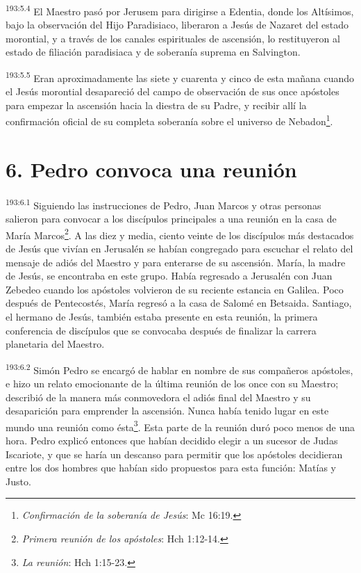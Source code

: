 \par
\textsuperscript{193:5.4} El Maestro pasó por Jerusem para dirigirse a Edentia, donde los Altísimos, bajo la observación del Hijo Paradisiaco, liberaron a Jesús de Nazaret del estado morontial, y a través de los canales espirituales de ascensión, lo restituyeron al estado de filiación paradisiaca y de soberanía suprema en Salvington.

\par
\textsuperscript{193:5.5} Eran aproximadamente las siete y cuarenta y cinco de esta mañana cuando el Jesús morontial desapareció del campo de observación de sus once apóstoles para empezar la ascensión hacia la diestra de su Padre, y recibir allí la confirmación oficial de su completa soberanía sobre el universo de Nebadon\footnote{\textit{Confirmación de la soberanía de Jesús}: Mc 16:19.}.

\section*{6. Pedro convoca una reunión}
\par
\textsuperscript{193:6.1} Siguiendo las instrucciones de Pedro, Juan Marcos y otras personas salieron para convocar a los discípulos principales a una reunión en la casa de María Marcos\footnote{\textit{Primera reunión de los apóstoles}: Hch 1:12-14.}. A las diez y media, ciento veinte de los discípulos más destacados de Jesús que vivían en Jerusalén se habían congregado para escuchar el relato del mensaje de adiós del Maestro y para enterarse de su ascensión. María, la madre de Jesús, se encontraba en este grupo. Había regresado a Jerusalén con Juan Zebedeo cuando los apóstoles volvieron de su reciente estancia en Galilea. Poco después de Pentecostés, María regresó a la casa de Salomé en Betsaida. Santiago, el hermano de Jesús, también estaba presente en esta reunión, la primera conferencia de discípulos que se convocaba después de finalizar la carrera planetaria del Maestro.

\par
\textsuperscript{193:6.2} Simón Pedro se encargó de hablar en nombre de sus compañeros apóstoles, e hizo un relato emocionante de la última reunión de los once con su Maestro; describió de la manera más conmovedora el adiós final del Maestro y su desaparición para emprender la ascensión. Nunca había tenido lugar en este mundo una reunión como ésta\footnote{\textit{La reunión}: Hch 1:15-23.}. Esta parte de la reunión duró poco menos de una hora. Pedro explicó entonces que habían decidido elegir a un sucesor de Judas Iscariote, y que se haría un descanso para permitir que los apóstoles decidieran entre los dos hombres que habían sido propuestos para esta función: Matías y Justo.

